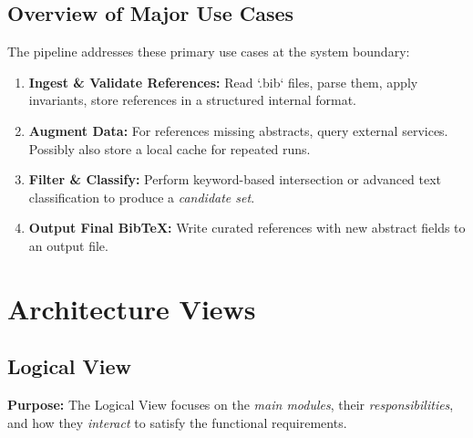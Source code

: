 \documentclass[12pt]{article}
\begin{document}
\subsection{Overview of Major Use Cases}
The pipeline addresses these primary use cases at the system boundary:
\begin{enumerate}
  \item \textbf{Ingest \& Validate References:} Read `.bib` files, parse them, apply invariants, store references in a structured internal format. 
  \item \textbf{Augment Data:} For references missing abstracts, query external services. Possibly also store a local cache for repeated runs.
  \item \textbf{Filter \& Classify:} Perform keyword-based intersection or advanced text classification to produce a \emph{candidate set}.
  \item \textbf{Output Final BibTeX:} Write curated references with new abstract fields to an output file.
\end{enumerate}

\section{Architecture Views}

\subsection{Logical View}
\label{sec:logical-view}

\textbf{Purpose:} The Logical View focuses on the \emph{main modules}, their \emph{responsibilities}, and how they \emph{interact} to satisfy the functional requirements.
\end{document}
